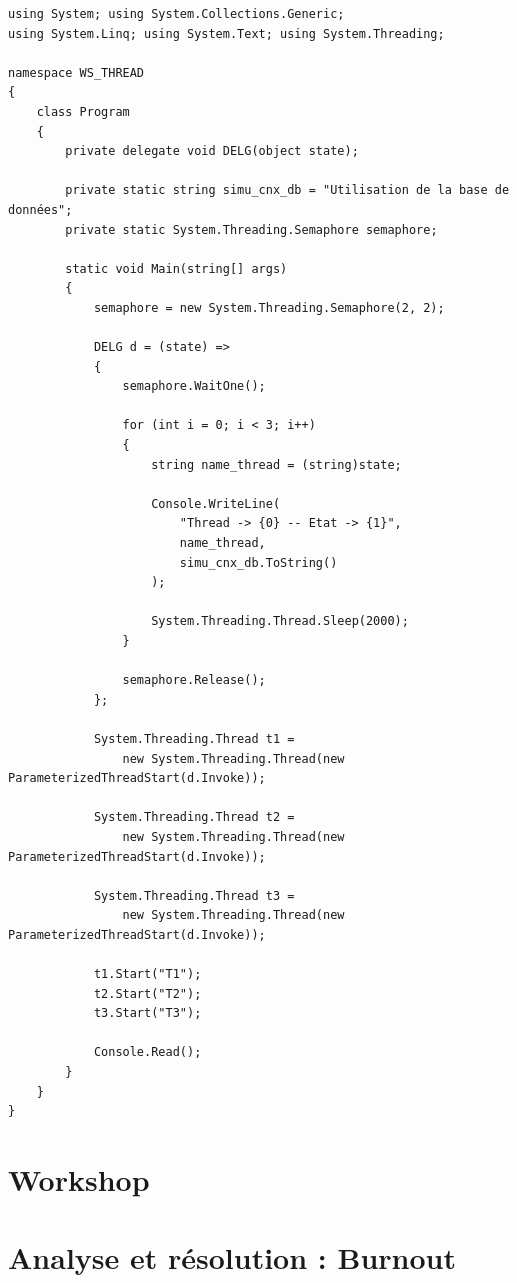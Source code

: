 \begin{verbatim}
using System; using System.Collections.Generic;
using System.Linq; using System.Text; using System.Threading;

namespace WS_THREAD
{
    class Program
    {
        private delegate void DELG(object state);

        private static string simu_cnx_db = "Utilisation de la base de données";
        private static System.Threading.Semaphore semaphore;

        static void Main(string[] args)
        {
            semaphore = new System.Threading.Semaphore(2, 2);

            DELG d = (state) =>
            {
                semaphore.WaitOne();

                for (int i = 0; i < 3; i++)
                {
                    string name_thread = (string)state;

                    Console.WriteLine(
                        "Thread -> {0} -- Etat -> {1}",
                        name_thread,
                        simu_cnx_db.ToString()
                    );

                    System.Threading.Thread.Sleep(2000);
                }

                semaphore.Release();
            };

            System.Threading.Thread t1 =
                new System.Threading.Thread(new ParameterizedThreadStart(d.Invoke));

            System.Threading.Thread t2 =
                new System.Threading.Thread(new ParameterizedThreadStart(d.Invoke));

            System.Threading.Thread t3 =
                new System.Threading.Thread(new ParameterizedThreadStart(d.Invoke));

            t1.Start("T1");
            t2.Start("T2");
            t3.Start("T3");

            Console.Read();
        }
    }
}
\end{verbatim}

\section*{Workshop}

\newpage

\section*{Analyse et résolution : Burnout}

